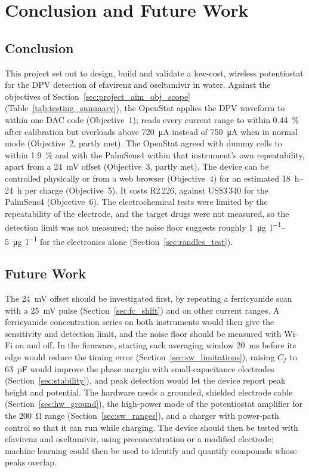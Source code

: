 \graphicspath{{conclusion/fig/}}

\chapter{Conclusion and Future Work}
\label{chap:conclusion}

\providecommand{\devname}{OpenStat}
\section{Conclusion}
\label{sec:conclusion}

This project set out to design, build and validate a low-cost, wireless potentiostat for the DPV detection of efavirenz and oseltamivir in water. Against the objectives of Section~\ref{sec:project_aim_obj_scope} (Table~\ref{tab:testing_summary}), the \devname{} applies the DPV waveform to within one DAC code (Objective~1); reads every current range to within \SI{0.44}{\percent} after calibration but overloads above \SI{720}{\micro\ampere} instead of \SI{750}{\micro\ampere} when in normal mode (Objective~2, partly met). The OpenStat agreed with dummy cells to within \SI{1.9}{\percent} and with the PalmSens4 within that instrument's own repeatability, apart from a \SI{24}{\milli\volt} offset (Objective~3, partly met). The device can be controlled physically or from a web browser (Objective~4) for an estimated \SIrange{18}{24}{\hour} per charge (Objective~5). It costs R2\,226, against US\$3\,340 for the PalmSens4 (Objective~6). The electrochemical tests were limited by the repeatability of the electrode, and the target drugs were not measured, so the detection limit was not measured; the noise floor suggests roughly \SIrange{1}{5}{\micro\gram\per\litre} for the electronics alone (Section~\ref{sec:randles_test}).

\section{Future Work}
\label{sec:future_work}

The \SI{24}{\milli\volt} offset should be investigated first, by repeating a ferricyanide scan with a \SI{25}{\milli\volt} pulse (Section~\ref{sec:fc_shift}) and on other current ranges. A ferricyanide concentration series on both instruments would then give the sensitivity and detection limit, and the noise floor should be measured with Wi-Fi on and off. In the firmware, starting each averaging window \SI{20}{\milli\second} before its edge would reduce the timing error (Section~\ref{sec:sw_limitations}), raising $C_f$ to \SI{63}{\pico\farad} would improve the phase margin with small-capacitance electrodes (Section~\ref{sec:stability}), and peak detection would let the device report peak height and potential. The hardware needs a grounded, shielded electrode cable (Section~\ref{sec:hw_ground}), the high-power mode of the potentiostat amplifier for the \SI{200}{\ohm} range (Section~\ref{sec:sw_ranges}), and a charger with power-path control so that it can run while charging. The device should then be tested with efavirenz and oseltamivir, using preconcentration or a modified electrode; machine learning could then be used to identify and quantify compounds whose peaks overlap.